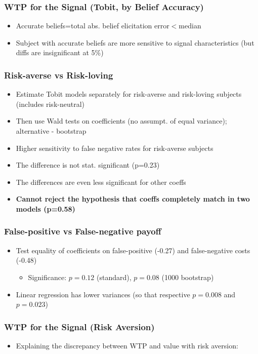 \documentclass[11pt,hyperref={bookmarks=false}]{beamer}
\begin{document}
\begin{frame}
\frametitle{WTP for the Signal (Tobit, by Belief Accuracy)}
\begin{itemize}
\item Accurate beliefs=total abs. belief elicitation error$<$median
\item Subject with accurate beliefs are more sensitive to signal characteristics (but diffs are insignificant at 5\%)
\end{itemize}
\footnotesize

\normalsize
\end{frame}



\begin{frame}
\frametitle{Risk-averse vs Risk-loving}
\begin{itemize}
\item Estimate Tobit models separately for risk-averse and risk-loving subjects (includes risk-neutral) 
\item Then use Wald tests on coefficients (no assumpt. of equal variance); alternative - bootstrap
\item Higher sensitivity to false negative rates for risk-averse subjects
\item The difference is not stat. significant (p=0.23)
\item The differences are even less significant for other coeffs
\item \textbf{Cannot reject the hypothesis that coeffs completely match in two models (p=0.58)}
\end{itemize}
\end{frame}


\begin{frame}
\frametitle{False-positive vs False-negative payoff}
\begin{itemize}
\item Test equality of coefficients on false-positive (-0.27) and false-negative costs (-0.48)
\begin{itemize}
\item Significance: $p=0.12$ (standard), $p=0.08$ (1000 bootstrap)
\end{itemize}
\item Linear regression has lower variances (so that respective $p=0.008$ and $p=0.023$)
\end{itemize}
\end{frame}




\begin{frame}
\frametitle{WTP for the Signal (Risk Aversion)}
\begin{itemize}
\item Explaining the discrepancy between WTP and value with risk aversion:
\end{itemize}
\footnotesize

\end{frame}
\end{document}
